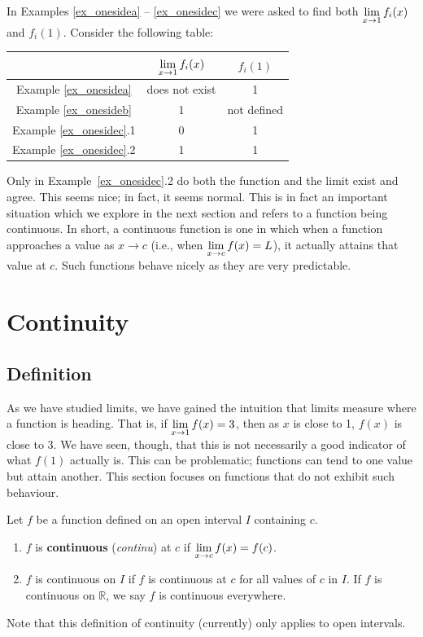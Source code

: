 In Examples \ref{ex_onesidea} -- \ref{ex_onesidec} we were asked to find both $\displaystyle \lim_{x\to 1}f_i(x)$ and $f_i(1)$. Consider the following table:
\begin{center}
\renewcommand{\arraystretch}{1.5}
\begin{tabular}{c|c|c} & $\displaystyle \lim_{x\to 1}f_i(x)$ & $f_i(1)$ \vspace{2pt}\\ \hline\hline
Example \ref{ex_onesidea} & does not exist & 1 \\
Example \ref{ex_onesideb} & 1 & not defined \\
Example \ref{ex_onesidec}.1 & 0 & 1 \\
Example \ref{ex_onesidec}.2 & 1 & 1 \\
\end{tabular}
\renewcommand{\arraystretch}{1}
\end{center}

Only in Example~\ref{ex_onesidec}.2 do both the function and the limit exist and agree. This seems nice; in fact, it seems normal. This is in fact an important situation which we explore in the next section and refers to a function being continuous. In short, a continuous function is one in which when a function approaches a value as $x\rightarrow c$ (i.e., when $\displaystyle \lim_{x\to c} f(x) = L$), it actually attains that value at $c$. Such functions behave nicely as they are very predictable.



\section{Continuity}\label{sec:continuity}
\subsection{Definition}
As we have studied limits, we have gained the intuition that limits measure where a function is heading. That is, if $\displaystyle \lim_{x\to 1} f(x) = 3$, then as $x$ is close to 1, $f(x)$ is close to 3. We have seen, though, that this is not necessarily a good indicator of what $f(1)$ actually is. This can be problematic; functions can tend to one value but attain another. This section focuses on functions that do not exhibit such behaviour.

\begin{definition}\label{def:continuous}
Let $f$ be a function defined on an open interval $I$ containing $c$.  
	\begin{enumerate}
	\item		$f$ is \textbf{continuous} (\textit{continu}) at $c$ if $\displaystyle \lim_{x\to c}f(x) = f(c)$.
	\item		$f$ is continuous on $I$ if $f$ is continuous at $c$ for all values of $c$ in $I$. If $f$ is continuous on $\mathbb{R}$, we say $f$ is continuous everywhere.
	\end{enumerate}
\end{definition}
Note that this definition of continuity (currently) only applies to open intervals.

